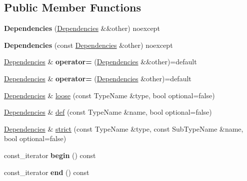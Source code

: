 \subsection*{Public Member Functions}
\begin{DoxyCompactItemize}
\item 
\hypertarget{classtheoria_1_1core_1_1Dependencies_a71b275a54e4261724540c60818d4ef85}{{\bfseries Dependencies} (\hyperlink{classtheoria_1_1core_1_1Dependencies}{Dependencies} \&\&other) noexcept}\label{classtheoria_1_1core_1_1Dependencies_a71b275a54e4261724540c60818d4ef85}

\item 
\hypertarget{classtheoria_1_1core_1_1Dependencies_ad3f8a71bd7ce6ff9e244d7072eb030e7}{{\bfseries Dependencies} (const \hyperlink{classtheoria_1_1core_1_1Dependencies}{Dependencies} \&other) noexcept}\label{classtheoria_1_1core_1_1Dependencies_ad3f8a71bd7ce6ff9e244d7072eb030e7}

\item 
\hypertarget{classtheoria_1_1core_1_1Dependencies_ac1b06e338d69428c95de7851dfc43935}{\hyperlink{classtheoria_1_1core_1_1Dependencies}{Dependencies} \& {\bfseries operator=} (\hyperlink{classtheoria_1_1core_1_1Dependencies}{Dependencies} \&\&other)=default}\label{classtheoria_1_1core_1_1Dependencies_ac1b06e338d69428c95de7851dfc43935}

\item 
\hypertarget{classtheoria_1_1core_1_1Dependencies_ac0c7b2c350c5e904732ed07b13852c21}{\hyperlink{classtheoria_1_1core_1_1Dependencies}{Dependencies} \& {\bfseries operator=} (\hyperlink{classtheoria_1_1core_1_1Dependencies}{Dependencies} \&other)=default}\label{classtheoria_1_1core_1_1Dependencies_ac0c7b2c350c5e904732ed07b13852c21}

\item 
\hyperlink{classtheoria_1_1core_1_1Dependencies}{Dependencies} \& \hyperlink{classtheoria_1_1core_1_1Dependencies_afa22a8f9fc20d3ce417bac397ba22e7a}{loose} (const Type\+Name \&type, bool optional=false)
\item 
\hyperlink{classtheoria_1_1core_1_1Dependencies}{Dependencies} \& \hyperlink{classtheoria_1_1core_1_1Dependencies_ae3995847906cda98292e0a9215797d41}{def} (const Type\+Name \&name, bool optional=false)
\item 
\hyperlink{classtheoria_1_1core_1_1Dependencies}{Dependencies} \& \hyperlink{classtheoria_1_1core_1_1Dependencies_a7daeed943359e4290cbdcf6d0c3c57b5}{strict} (const Type\+Name \&type, const Sub\+Type\+Name \&name, bool optional=false)
\item 
\hypertarget{classtheoria_1_1core_1_1Dependencies_a74a125caae88f7d35fbf1f91e4eb7b05}{const\+\_\+iterator {\bfseries begin} () const }\label{classtheoria_1_1core_1_1Dependencies_a74a125caae88f7d35fbf1f91e4eb7b05}

\item 
\hypertarget{classtheoria_1_1core_1_1Dependencies_acd51d67e1da8b8f527c90ef699761c51}{const\+\_\+iterator {\bfseries end} () const }\label{classtheoria_1_1core_1_1Dependencies_acd51d67e1da8b8f527c90ef699761c51}

\end{DoxyCompactItemize}
